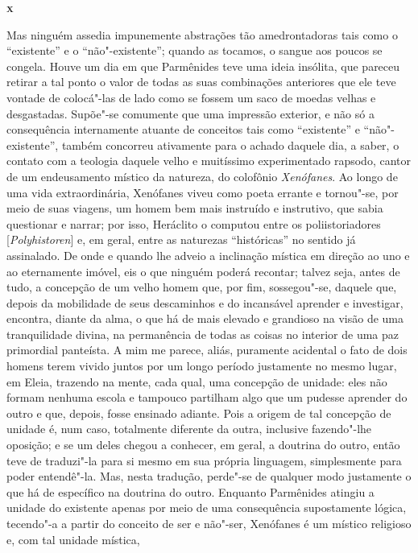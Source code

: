 \bigskip
\textsc{\textbf{x}}
\bigskip


Mas ninguém assedia impunemente abstrações tão amedrontadoras tais como o
``existente'' e o ``não"-existente''; quando as tocamos, o sangue aos poucos
se congela. Houve um dia em que Parmênides teve uma ideia insólita, que
pareceu retirar a tal ponto o valor de todas as suas combinações anteriores
que ele teve vontade de colocá"-las de lado como se fossem um saco de moedas
velhas e desgastadas. Supõe"-se comumente que uma impressão exterior, e não
só a consequência internamente atuante de conceitos tais como ``existente'' e
``não"-existente'', também concorreu ativamente para o achado daquele dia, a
saber, o contato com a teologia daquele velho e muitíssimo experimentado
rapsodo, cantor de um endeusamento místico da natureza, do colofônio \textit{Xenófanes}. 
Ao longo de uma vida extraordinária, Xenófanes viveu como poeta
errante e tornou"-se, por meio de suas viagens, um homem bem mais instruído e
instrutivo, que sabia questionar e narrar; por isso, Heráclito o computou
entre os poliistoriadores [\textit{Polyhistoren}] e, em geral, entre as
naturezas ``históricas'' no sentido já assinalado. De onde e quando lhe
adveio a inclinação mística em direção ao uno e ao eternamente imóvel, eis o
que ninguém poderá recontar; talvez seja, antes de tudo, a concepção de um
velho homem que, por fim, sossegou"-se, \label{velhohomem} daquele que,
depois da mobilidade de seus descaminhos e do incansável aprender e
investigar, encontra, diante da alma, o que há de mais elevado e grandioso na
visão de uma tranquilidade divina, na permanência de todas as coisas no
interior de uma paz primordial panteísta. A mim me parece, aliás, puramente
acidental o fato de dois homens terem vivido juntos por um longo período
justamente no mesmo lugar, em Eleia, trazendo na mente, cada qual, uma
concepção de unidade: eles não formam nenhuma escola e tampouco partilham
algo que um pudesse aprender do outro e que, depois, fosse ensinado adiante.
Pois a origem de tal concepção de unidade é, num caso, totalmente diferente
da outra, inclusive fazendo"-lhe oposição; e se um deles chegou a conhecer,
em geral, a doutrina do outro, então teve de traduzi"-la para si mesmo em sua
própria linguagem, simplesmente para poder entendê"-la. Mas, nesta tradução,
perde"-se de qualquer modo justamente o que há de específico na doutrina do
outro. Enquanto Parmênides atingiu a unidade do existente apenas por meio de
uma consequência supostamente lógica, tecendo"-a a partir do conceito de ser
e não"-ser, Xenófanes é um místico religioso e, com tal unidade mística,
